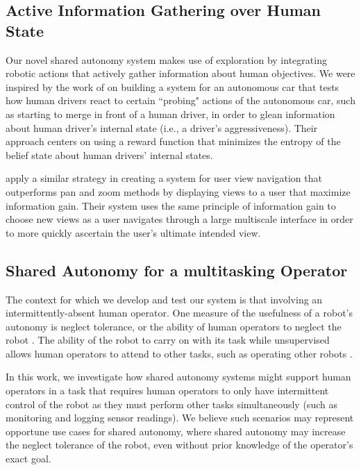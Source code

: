 \documentclass[conference]{IEEEtran}
\begin{document}
\subsection{Active Information Gathering over Human State}
Our novel shared autonomy system makes use of exploration by integrating robotic actions that actively gather information about human objectives. We were inspired by the work of \citet{sadigh2016information} on building a system for an autonomous car that tests how human drivers react to certain ``probing" actions of the autonomous car, such as starting to merge in front of a human driver, in order to glean information about human driver's internal state (i.e., a driver's aggressiveness). Their approach centers on using a reward function that minimizes the entropy of the belief state about human drivers' internal states.

\citet{liu2017bignav} apply a similar strategy in creating a system for user view navigation that outperforms pan and zoom methods by displaying views to a user that maximize information gain. Their system uses the same principle of information gain to choose new views as a user navigates through a large multiscale interface in order to more quickly ascertain the user's ultimate intended view.

\subsection{Shared Autonomy for a multitasking Operator}
The context for which we develop and test our system is that involving an intermittently-absent human operator. One measure of the usefulness of a robot's autonomy is neglect tolerance, or the ability of human operators to neglect the robot \cite{crandall2002characterizing, olsen2003metrics}. The ability of the robot to carry on with its task while unsupervised allows human operators to attend to other tasks, such as operating other robots \cite{crandall2005validating, cummings2008predicting}.

In this work, we investigate how shared autonomy systems might support human operators in a task that requires human operators to only have intermittent control of the robot as they must perform other tasks simultaneously (such as monitoring and logging sensor readings). We believe such scenarios may represent opportune use cases for shared autonomy, where shared autonomy may increase the neglect tolerance of the robot, even without prior knowledge of the operator's exact goal.
\end{document}
